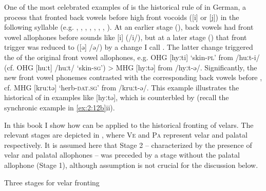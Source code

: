 \begin{xlist}
\begin{xlist}
One of the most celebrated examples of  is the historical rule of \textsc{} in German, a process that fronted back vowels before high front vocoids ([i] or [j]) in the following syllable (e.g. \citealt{Twaddell1938}, \citealt{Penzl1949}, \citealt{Becker1967}, \citealt{King1969}, \citealt{Buccini1992}, \citealt{DavisIverson1995}, \citealt{DavisSalmons1999}, \citealt{Fulk2018}). At an earlier stage (), back vowels had front vowel allophones before sounds like [i] (/i/), but at a later stage () that front  trigger was reduced to  ([ə] /ə/) by a change I call . The latter change triggered the  of the original front vowel allophones, e.g. OHG [hyːti] ‘skin-\textsc{pl}’ from /huːt-i/ (cf. OHG [huːt] /huːt/ ‘skin-\textsc{sg}’) > MHG [hyːtə] from /hyːt-ə/. Significantly, the new front vowel phonemes contrasted with the corresponding back vowels before , cf. MHG [kruːtə] ‘herb-\textsc{dat}.\textsc{sg}’ from /kruːt-ə/. This example illustrates the historical  of  in examples like [hyːtə], which is counterbled by  (recall the synchronic example in \ref{ex:2:12b}ii).

 In this book I show how  can be applied to the historical fronting of velars. The relevant stages are depicted in , where \textsc{Ve} and \textsc{Pa} represent velar and palatal respectively. It is assumed here that Stage 2 -- characterized by the presence of velar and palatal allophones -- was preceded by a stage without the palatal allophone (Stage 1), although assumption is not crucial for the discussion below.

\ea%
    \label{ex:2:34}
    Three stages for velar fronting\\
\z


\end{xlist}
\end{xlist}
